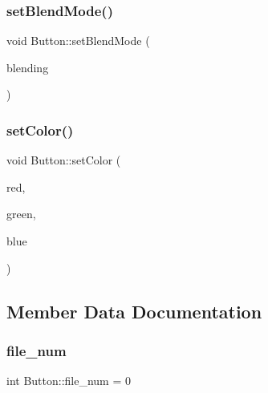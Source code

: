 \mbox{\label{class_button_a6abacb86ed21f8d06dca634a8ff9bde2}} 
\subsubsection{\texorpdfstring{set\+Blend\+Mode()}{setBlendMode()}}
{\footnotesize\ttfamily void Button\+::set\+Blend\+Mode (\begin{DoxyParamCaption}\item[{S\+D\+L\+\_\+\+Blend\+Mode}]{blending }\end{DoxyParamCaption})}

\mbox{\label{class_button_a353eabb5dcb11670e8ce1094f3ba77b4}} 
\subsubsection{\texorpdfstring{set\+Color()}{setColor()}}
{\footnotesize\ttfamily void Button\+::set\+Color (\begin{DoxyParamCaption}\item[{Uint8}]{red,  }\item[{Uint8}]{green,  }\item[{Uint8}]{blue }\end{DoxyParamCaption})}



\subsection{Member Data Documentation}
\mbox{\label{class_button_acbdc1b6ff9b8651ed0bcfaae9fe74610}} 
\subsubsection{\texorpdfstring{file\+\_\+num}{file\_num}}
{\footnotesize\ttfamily int Button\+::file\+\_\+num = 0\hspace{0.3cm}{\ttfamily [private]}}

\mbox{\label{class_button_a16e3433e25036f17d11ce38b178596bd}} 
